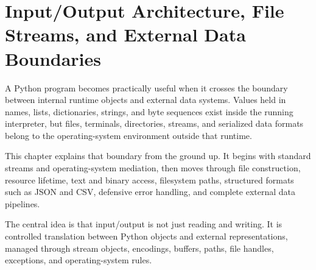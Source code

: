\chapter{Input/Output Architecture, File Streams, and External Data Boundaries}

A Python program becomes practically useful when it crosses the boundary between internal runtime objects and external data systems. Values held in names, lists, dictionaries, strings, and byte sequences exist inside the running interpreter, but files, terminals, directories, streams, and serialized data formats belong to the operating-system environment outside that runtime.

This chapter explains that boundary from the ground up. It begins with standard streams and operating-system mediation, then moves through file construction, resource lifetime, text and binary access, filesystem paths, structured formats such as JSON and CSV, defensive error handling, and complete external data pipelines.

The central idea is that input/output is not just reading and writing. It is controlled translation between Python objects and external representations, managed through stream objects, encodings, buffers, paths, file handles, exceptions, and operating-system rules.